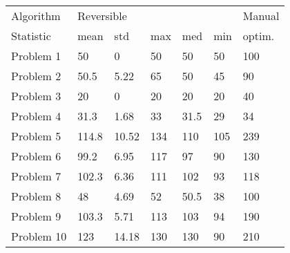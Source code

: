 \begin{tabular}{lllllll}
\toprule
Algorithm & \multicolumn{5}{l}{Reversible} & Manual \\
Statistic &       mean &    std &  max &   med &  min & optim. \\
\midrule
Problem 1  &         50 &      0 &   50 &    50 &   50 &    100 \\
Problem 2  &       50.5 &   5.22 &   65 &    50 &   45 &     90 \\
Problem 3  &         20 &      0 &   20 &    20 &   20 &     40 \\
Problem 4  &       31.3 &   1.68 &   33 &  31.5 &   29 &     34 \\
Problem 5  &      114.8 &  10.52 &  134 &   110 &  105 &    239 \\
Problem 6  &       99.2 &   6.95 &  117 &    97 &   90 &    130 \\
Problem 7  &      102.3 &   6.36 &  111 &   102 &   93 &    118 \\
Problem 8  &         48 &   4.69 &   52 &  50.5 &   38 &    100 \\
Problem 9  &      103.3 &   5.71 &  113 &   103 &   94 &    190 \\
Problem 10 &        123 &  14.18 &  130 &   130 &   90 &    210 \\
\bottomrule
\end{tabular}
